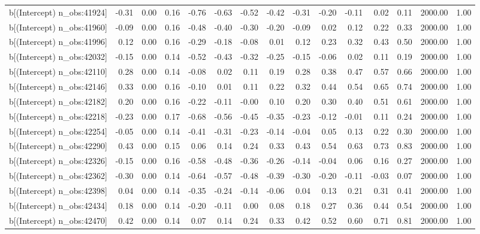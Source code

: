 \begin{table}[ht]
\begin{tabular}{rrrrrrrrrrrrrrr}
  b[(Intercept) n\_obs:41924] & -0.31 & 0.00 & 0.16 & -0.76 & -0.63 & -0.52 & -0.42 & -0.31 & -0.20 & -0.11 & 0.02 & 0.11 & 2000.00 & 1.00 \\ 
  b[(Intercept) n\_obs:41960] & -0.09 & 0.00 & 0.16 & -0.48 & -0.40 & -0.30 & -0.20 & -0.09 & 0.02 & 0.12 & 0.22 & 0.33 & 2000.00 & 1.00 \\ 
  b[(Intercept) n\_obs:41996] & 0.12 & 0.00 & 0.16 & -0.29 & -0.18 & -0.08 & 0.01 & 0.12 & 0.23 & 0.32 & 0.43 & 0.50 & 2000.00 & 1.00 \\ 
  b[(Intercept) n\_obs:42032] & -0.15 & 0.00 & 0.14 & -0.52 & -0.43 & -0.32 & -0.25 & -0.15 & -0.06 & 0.02 & 0.11 & 0.19 & 2000.00 & 1.00 \\ 
  b[(Intercept) n\_obs:42110] & 0.28 & 0.00 & 0.14 & -0.08 & 0.02 & 0.11 & 0.19 & 0.28 & 0.38 & 0.47 & 0.57 & 0.66 & 2000.00 & 1.00 \\ 
  b[(Intercept) n\_obs:42146] & 0.33 & 0.00 & 0.16 & -0.10 & 0.01 & 0.11 & 0.22 & 0.32 & 0.44 & 0.54 & 0.65 & 0.74 & 2000.00 & 1.00 \\ 
  b[(Intercept) n\_obs:42182] & 0.20 & 0.00 & 0.16 & -0.22 & -0.11 & -0.00 & 0.10 & 0.20 & 0.30 & 0.40 & 0.51 & 0.61 & 2000.00 & 1.00 \\ 
  b[(Intercept) n\_obs:42218] & -0.23 & 0.00 & 0.17 & -0.68 & -0.56 & -0.45 & -0.35 & -0.23 & -0.12 & -0.01 & 0.11 & 0.24 & 2000.00 & 1.00 \\ 
  b[(Intercept) n\_obs:42254] & -0.05 & 0.00 & 0.14 & -0.41 & -0.31 & -0.23 & -0.14 & -0.04 & 0.05 & 0.13 & 0.22 & 0.30 & 2000.00 & 1.00 \\ 
  b[(Intercept) n\_obs:42290] & 0.43 & 0.00 & 0.15 & 0.06 & 0.14 & 0.24 & 0.33 & 0.43 & 0.54 & 0.63 & 0.73 & 0.83 & 2000.00 & 1.00 \\ 
  b[(Intercept) n\_obs:42326] & -0.15 & 0.00 & 0.16 & -0.58 & -0.48 & -0.36 & -0.26 & -0.14 & -0.04 & 0.06 & 0.16 & 0.27 & 2000.00 & 1.00 \\ 
  b[(Intercept) n\_obs:42362] & -0.30 & 0.00 & 0.14 & -0.64 & -0.57 & -0.48 & -0.39 & -0.30 & -0.20 & -0.11 & -0.03 & 0.07 & 2000.00 & 1.00 \\ 
  b[(Intercept) n\_obs:42398] & 0.04 & 0.00 & 0.14 & -0.35 & -0.24 & -0.14 & -0.06 & 0.04 & 0.13 & 0.21 & 0.31 & 0.41 & 2000.00 & 1.00 \\ 
  b[(Intercept) n\_obs:42434] & 0.18 & 0.00 & 0.14 & -0.20 & -0.11 & 0.00 & 0.08 & 0.18 & 0.27 & 0.36 & 0.44 & 0.54 & 2000.00 & 1.00 \\ 
  b[(Intercept) n\_obs:42470] & 0.42 & 0.00 & 0.14 & 0.07 & 0.14 & 0.24 & 0.33 & 0.42 & 0.52 & 0.60 & 0.71 & 0.81 & 2000.00 & 1.00 \\ 

\end{tabular}
\end{table}

